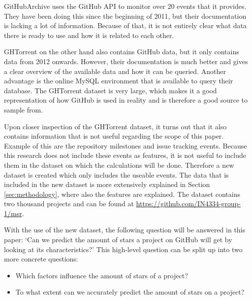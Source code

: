     GitHubArchive uses the GitHub API to monitor over 20 events \cite{github-events-2016} that it provides. 
    They have been doing this since the beginning of 2011, but their documentation is lacking a lot of information.
    Because of that, it is not entirely clear what data there is ready to use and how it is related to each other.
    
    GHTorrent on the other hand also contains GitHub data, but it only contains data from 2012 onwards.
    However, their documentation is much better and gives a clear overview of the available data and how it can be queried.
    Another advantage is the online MySQL environment \cite{ghtorrent-dblit-2016} that is available to query their database.
    The GHTorrent dataset is very large, which makes it a good representation of how GitHub is used in reality and is therefore a good source to sample from.



    Upon closer inspection of the GHTorrent dataset, it turns out that it also contains information that is not useful regarding the scope of this paper. 
    Example of this are the repository milestones and issue tracking events.
    Because this research does not include these events as features, it is not useful to include them in the dataset on which the calculations will be done. 
    Therefore a new dataset is created which only includes the useable events. 
    The data that is included in the new dataset is more extensively explained in Section \ref{sec:methodology}, where also the features are explained.
    The dataset contains two thousand projects and can be found at \url{https://github.com/IN4334-group-1/msr}.

    With the use of the new dataset, the following question will be answered in this paper: `Can we predict the amount of stars a project on GitHub will get by looking at its characteristics?'
    This high-level question can be split up into two more concrete questions:
    \begin{itemize}
        \item Which factors influence the amount of stars of a project?
        \item To what extent can we accurately predict the amount of stars on a project?
    \end{itemize}




